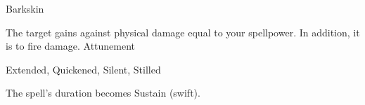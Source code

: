 \begin{spellsection}{Barkskin}
\begin{spellheader}
\end{spellheader}
\begin{spellcontent}
\begin{spelltargetinginfo}
\end{spelltargetinginfo}
\begin{spelleffects}
\spelleffect
The target gains  against physical damage equal to your spellpower.
In addition, it is  to fire damage.
\spelldur Attunement
\end{spelleffects}
\end{spellcontent}
\begin{spellfooter}
 Extended, Quickened, Silent, Stilled
\end{spellfooter}
\begin{spellsubcontent}
\begin{spellcantrip}
The spell's duration becomes Sustain (swift).
\end{spellcantrip}
\end{spellsubcontent}
\end{spellsection}
